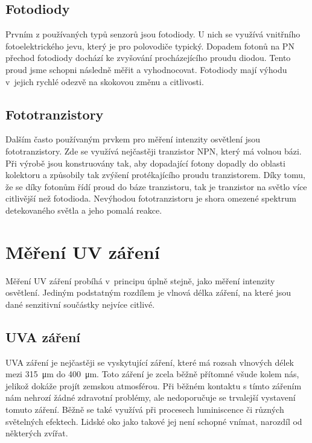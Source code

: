 \subsection{Fotodiody}

Prvním z používaných typů senzorů jsou fotodiody. U nich se využívá vnitřního fotoelektrického jevu, který je pro polovodiče typický. Dopadem fotonů na PN přechod fotodiody dochází ke zvyšování procházejícího proudu diodou. Tento proud jsme schopni následně měřit a vyhodnocovat. Fotodiody mají výhodu v~jejich rychlé odezvě na skokovou změnu a citlivosti.

\subsection{Fototranzistory}

Dalším často používaným prvkem pro měření intenzity osvětlení jsou fototranzistory. Zde se využívá nejčastěji tranzistor NPN, který má volnou bázi. Při výrobě jsou konstruovány tak, aby dopadající fotony dopadly do oblasti kolektoru a způsobily tak zvýšení protékajícího proudu tranzistorem. Díky tomu, že se díky fotonům řídí proud do báze tranzistoru, tak je tranzistor na světlo více citlivější než fotodioda. Nevýhodou fototranzistoru je shora omezené spektrum detekovaného světla a jeho pomalá reakce.

\section{Měření UV záření}

Měření UV záření probíhá v~principu úplně stejně, jako měření intenzity osvětlení. Jediným podstatným rozdílem je vlnová délka záření, na které jsou dané senzitivní součástky nejvíce citlivé. 

\subsection{UVA záření}

UVA záření je nejčastěji se vyskytující záření, které má rozsah vlnových délek mezi \SI{315}{\micro\metre} do \SI{400}{\micro\metre}. Toto záření je zcela běžně přítomné všude kolem nás, jelikož dokáže projít zemskou atmosférou. Při běžném kontaktu s tímto zářením nám nehrozí žádné zdravotní problémy, ale nedoporučuje se trvalejší vystavení tomuto záření. Běžně se také využívá při procesech luminiscence či různých světelných efektech. Lidské oko jako takové jej není schopné vnímat, narozdíl od některých zvířat.

